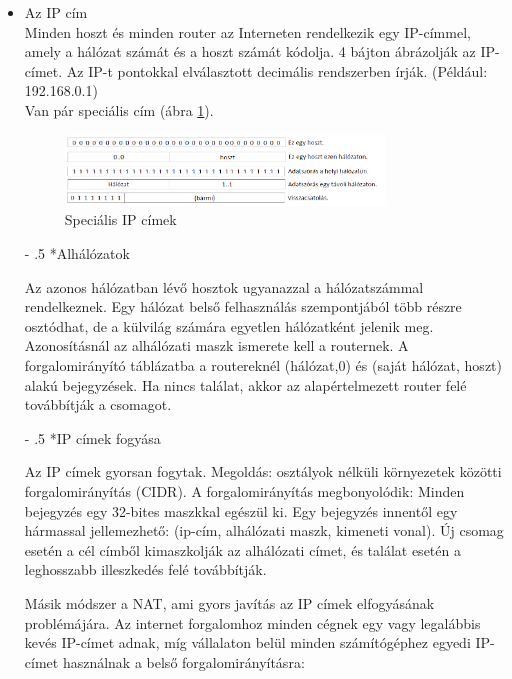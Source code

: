 \documentclass[12pt]{article}
\makeatletter
\renewcommand\paragraph{%
	\@startsection{paragraph}{4}{0mm}%
	{-\baselineskip}%
	{.5\baselineskip}%
	{\normalfont\normalsize\bfseries}}
\makeatother
\begin{document}
\begin{itemize}[leftmargin=7.5mm]
    	\item Az IP cím \\
        Minden hoszt és minden router az Interneten rendelkezik egy IP-címmel, amely a hálózat számát és a hoszt számát kódolja. 4 bájton ábrázolják az IP-címet. Az IP-t pontokkal elválasztott decimális rendszerben írják. (Például: 192.168.0.1)\\
        Van pár speciális cím (ábra \ref{fig:ip_spec_cimek}).

        \begin{figure}[H]
        	\centering
        	\includegraphics[width=0.8\textwidth]{img/ip_spec_cimek.png}
        	\caption{Speciális IP címek}
        	\label{fig:ip_spec_cimek}
        \end{figure}

        \paragraph*{Alhálózatok}

        Az azonos hálózatban lévő hosztok ugyanazzal a hálózatszámmal rendelkeznek. Egy hálózat belső felhasználás szempontjából több részre osztódhat, de a külvilág számára egyetlen hálózatként jelenik meg. Azonosításnál az alhálózati maszk ismerete kell a routernek. A forgalomirányító táblázatba a routereknél (hálózat,0) és (saját hálózat, hoszt) alakú bejegyzések. Ha nincs találat, akkor az alapértelmezett router felé továbbítják a csomagot.

        \paragraph*{IP címek fogyása}

        Az IP címek gyorsan fogytak. Megoldás: osztályok nélküli környezetek közötti forgalomirányítás (CIDR). A forgalomirányítás megbonyolódik: Minden bejegyzés egy 32-bites maszkkal egészül ki. Egy bejegyzés innentől egy hármassal jellemezhető: (ip-cím, alhálózati maszk, kimeneti vonal). Új csomag esetén a cél címből kimaszkolják az alhálózati címet, és találat esetén a leghosszabb illeszkedés felé továbbítják.

        Másik módszer a NAT, ami gyors javítás az IP címek elfogyásának problémájára. Az internet forgalomhoz minden cégnek egy vagy legalábbis kevés IP-címet adnak, míg vállalaton belül minden számítógéphez egyedi IP-címet használnak a belső forgalomirányításra: \\


\end{itemize}
\end{document}
